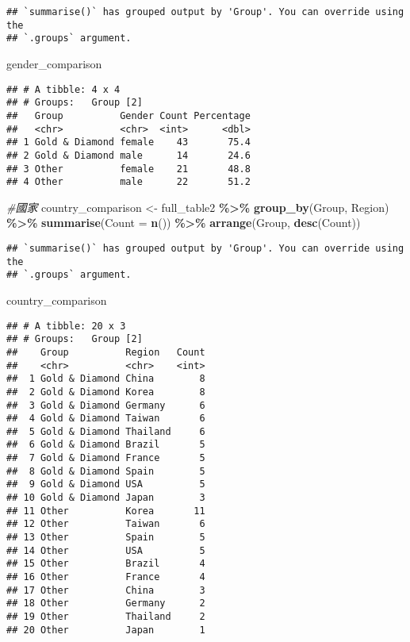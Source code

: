 \documentclass[
]{article}
\newenvironment{Shaded}{\begin{snugshade}}{\end{snugshade}}
\newcommand{\AttributeTok}[1]{\textcolor[rgb]{0.13,0.29,0.53}{#1}}
\newcommand{\CommentTok}[1]{\textcolor[rgb]{0.56,0.35,0.01}{\textit{#1}}}
\newcommand{\FunctionTok}[1]{\textcolor[rgb]{0.13,0.29,0.53}{\textbf{#1}}}
\newcommand{\NormalTok}[1]{#1}
\newcommand{\OtherTok}[1]{\textcolor[rgb]{0.56,0.35,0.01}{#1}}
\newcommand{\SpecialCharTok}[1]{\textcolor[rgb]{0.81,0.36,0.00}{\textbf{#1}}}
\begin{document}
\begin{verbatim}
## `summarise()` has grouped output by 'Group'. You can override using the
## `.groups` argument.
\end{verbatim}

\begin{Shaded}
\begin{Highlighting}[]
\NormalTok{gender\_comparison}
\end{Highlighting}
\end{Shaded}

\begin{verbatim}
## # A tibble: 4 x 4
## # Groups:   Group [2]
##   Group          Gender Count Percentage
##   <chr>          <chr>  <int>      <dbl>
## 1 Gold & Diamond female    43       75.4
## 2 Gold & Diamond male      14       24.6
## 3 Other          female    21       48.8
## 4 Other          male      22       51.2
\end{verbatim}

\begin{Shaded}
\begin{Highlighting}[]
\CommentTok{\#國家}
\NormalTok{country\_comparison }\OtherTok{\textless{}{-}}\NormalTok{ full\_table2 }\SpecialCharTok{\%\textgreater{}\%}
  \FunctionTok{group\_by}\NormalTok{(Group, Region) }\SpecialCharTok{\%\textgreater{}\%}
  \FunctionTok{summarise}\NormalTok{(}\AttributeTok{Count =} \FunctionTok{n}\NormalTok{()) }\SpecialCharTok{\%\textgreater{}\%}
  \FunctionTok{arrange}\NormalTok{(Group, }\FunctionTok{desc}\NormalTok{(Count))}
\end{Highlighting}
\end{Shaded}

\begin{verbatim}
## `summarise()` has grouped output by 'Group'. You can override using the
## `.groups` argument.
\end{verbatim}

\begin{Shaded}
\begin{Highlighting}[]
\NormalTok{country\_comparison}
\end{Highlighting}
\end{Shaded}

\begin{verbatim}
## # A tibble: 20 x 3
## # Groups:   Group [2]
##    Group          Region   Count
##    <chr>          <chr>    <int>
##  1 Gold & Diamond China        8
##  2 Gold & Diamond Korea        8
##  3 Gold & Diamond Germany      6
##  4 Gold & Diamond Taiwan       6
##  5 Gold & Diamond Thailand     6
##  6 Gold & Diamond Brazil       5
##  7 Gold & Diamond France       5
##  8 Gold & Diamond Spain        5
##  9 Gold & Diamond USA          5
## 10 Gold & Diamond Japan        3
## 11 Other          Korea       11
## 12 Other          Taiwan       6
## 13 Other          Spain        5
## 14 Other          USA          5
## 15 Other          Brazil       4
## 16 Other          France       4
## 17 Other          China        3
## 18 Other          Germany      2
## 19 Other          Thailand     2
## 20 Other          Japan        1
\end{verbatim}
\end{document}
